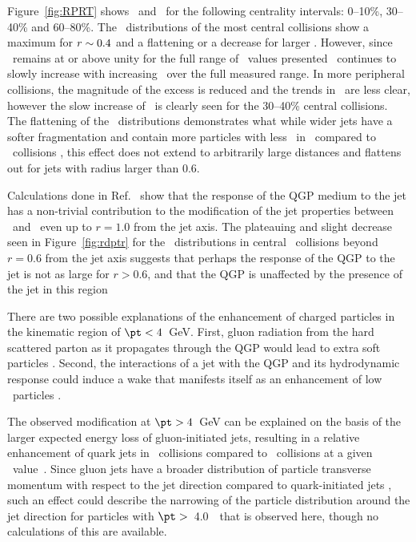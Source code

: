 Figure~\ref{fig:RPRT} shows \RTheta\ and \RP\ for the following centrality intervals: 0--10\%, 30--40\% and 60--80\%.
The \RTheta\ distributions of the most central collisions show a maximum for $\mbox{$r$} \sim 0.4$ and a flattening or a decrease for larger \rvar.
However, since \RTheta\ remains at or above unity for the full range of \rvar\ values presented \RP\ continues to slowly increase with increasing \rvar\ over the full measured range.
In more peripheral collisions, the magnitude of the excess is reduced and the trends in \RTheta\ are less clear, however the slow increase of \RP\ is clearly seen for the 30--40\% central collisions.
The flattening of the \RP\ distributions demonstrates what while wider jets have a softer fragmentation and contain more particles with less \pt\ in \pbpb\ compared to \pp\ collisions \cite{Chesler2016, Hulcher:2017cpt}, this effect does not extend to arbitrarily large distances and flattens out for jets with radius larger than 0.6.


Calculations done in Ref.~\cite{Tachibana:2017syd} show that the response of the QGP medium to the jet has a non-trivial contribution to the modification of the jet properties between \pp\ and \pbpb\ even up to $r = 1.0$ from the jet axis.
The plateauing and slight decrease seen in Figure~\ref{fig:rdptr} for the \RDptr\ distributions in central \pbpb\ collisions beyond $r = 0.6$ from the jet axis suggests that perhaps the response of the QGP to the jet is not as large for $r > 0.6$, and that the QGP is unaffected by the presence of the jet in this region

There are two possible explanations of the enhancement of charged particles in the kinematic region of \mbox{$\pt < 4$ GeV}.
First, gluon radiation from the hard scattered parton as it propagates through the QGP would lead to extra soft particles \cite{Chien:2015vja, Kang:2017frl}.
Second, the interactions of a jet with the QGP and its hydrodynamic response could induce a wake that manifests itself as an enhancement of low \pt\ particles \cite{Tachibana:2017syd}.

The observed modification at \mbox{$\pt > 4$ GeV} can be explained on the basis of the larger expected energy loss of gluon-initiated jets, resulting in a relative enhancement of quark jets in \pbpb\ collisions compared to \pp\ collisions at a given \ptjet\ value~\cite{Aaboud:2018hpb, Spousta:2015fca}.
Since gluon jets have a broader distribution of particle transverse momentum with respect to the jet direction compared to quark-initiated jets \cite{OPAL:1995ab}, such an effect could describe the narrowing of the particle distribution around the jet direction for particles with $\pt >$~4.0~\GeV\ that is observed here, though no calculations of this are available.


